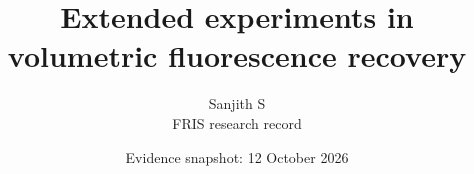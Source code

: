\title{Extended experiments in\\volumetric fluorescence recovery}
\author{Sanjith S\\\small FRIS research record}
\date{Evidence snapshot: 12 October 2026}

